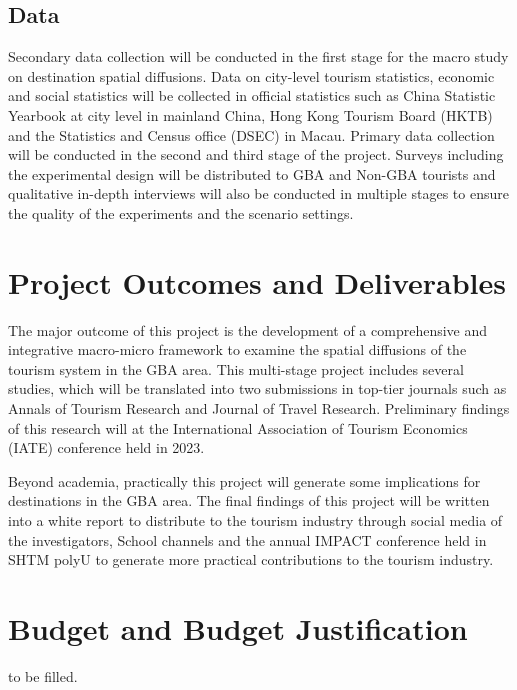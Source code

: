 \documentclass[11pt,a4paper]{amsart}
\theoremstyle{plain}
\theoremstyle{definition}
\begin{document}
\subsection{Data}\hfill\par 
\noindent Secondary data collection will be conducted in the first stage for the macro study on destination spatial diffusions. Data on city-level tourism statistics, economic and social statistics will be collected in official statistics such as China Statistic Yearbook at city level in mainland China, Hong Kong Tourism Board (HKTB) and the Statistics and Census office (DSEC) in Macau.
Primary data collection will be conducted in the second and third stage of the project. Surveys including the experimental design will be distributed to GBA and Non-GBA tourists and qualitative in-depth interviews will also be conducted in multiple stages to ensure the quality of the experiments and the scenario settings.

\section{Project Outcomes and Deliverables}\hfill\par
\noindent The major outcome of this project is the development of a comprehensive and integrative macro-micro framework to examine the spatial diffusions of the tourism system in the GBA area. This multi-stage project includes several studies, which will be translated into two submissions in top-tier journals such as Annals of Tourism Research and Journal of Travel Research. Preliminary findings of this research will at the International Association of Tourism Economics (IATE) conference held in 2023.

\noindent Beyond academia, practically this project will generate some implications for destinations in the GBA area. The final findings of this project will be written into a white report to distribute to the tourism industry through social media of the investigators, School channels and the annual IMPACT conference held in SHTM polyU to generate more practical contributions to the tourism industry.  

\section{Budget and Budget Justification}
to be filled.
\end{document}
